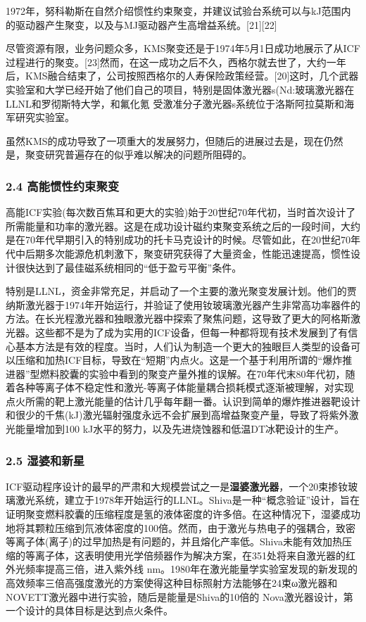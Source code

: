 1972年，努科勒斯在自然介绍惯性约束聚变，并建议试验台系统可以与kJ范围内的驱动器产生聚变，以及与MJ驱动器产生高增益系统。[21][22]

尽管资源有限，业务问题众多，KMS聚变还是于1974年5月1日成功地展示了从ICF过程进行的聚变。[23]然而，在这一成功之后不久，西格尔就去世了，大约一年后，KMS融合结束了，公司按照西格尔的人寿保险政策经营。[20]这时，几个武器实验室和大学已经开始了他们自己的项目，特别是固体激光器s(Nd:玻璃激光器在LLNL和罗彻斯特大学，和氟化氪 受激准分子激光器s系统位于洛斯阿拉莫斯和海军研究实验室。

虽然KMS的成功导致了一项重大的发展努力，但随后的进展过去是，现在仍然是，聚变研究普遍存在的似乎难以解决的问题所阻碍的。
\subsubsection{2.4 高能惯性约束聚变}
高能ICF实验(每次数百焦耳和更大的实验)始于20世纪70年代初，当时首次设计了所需能量和功率的激光器。这是在成功设计磁约束聚变系统之后的一段时间，大约是在70年代早期引入的特别成功的托卡马克设计的时候。尽管如此，在20世纪70年代中后期多次能源危机刺激下，聚变研究获得了大量资金，性能迅速提高，惯性设计很快达到了最佳磁系统相同的“低于盈亏平衡”条件。

特别是LLNL，资金非常充足，并启动了一个主要的激光聚变发展计划。他们的贾纳斯激光器于1974年开始运行，并验证了使用钕玻璃激光器产生非常高功率器件的方法。在长光程激光器和独眼激光器中探索了聚焦问题，这导致了更大的阿格斯激光器。这些都不是为了成为实用的ICF设备，但每一种都将现有技术发展到了有信心基本方法是有效的程度。当时，人们认为制造一个更大的独眼巨人类型的设备可以压缩和加热ICF目标，导致在“短期”内点火。这是一个基于利用所谓的“爆炸推进器”型燃料胶囊的实验中看到的聚变产量外推的误解。在70年代末80年代初，随着各种等离子体不稳定性和激光-等离子体能量耦合损耗模式逐渐被理解，对实现点火所需的靶上激光能量的估计几乎每年翻一番。认识到简单的爆炸推进器靶设计和很少的千焦(kJ)激光辐射强度永远不会扩展到高增益聚变产量，导致了将紫外激光能量增加到100 kJ水平的努力，以及先进烧蚀器和低温DT冰靶设计的生产。
\subsubsection{2.5 湿婆和新星}
ICF驱动程序设计的最早的严肃和大规模尝试之一是\textbf{湿婆激光器}，一个20束掺钕玻璃激光系统，建立于1978年开始运行的LLNL。Shiva是一种“概念验证”设计，旨在证明聚变燃料胶囊的压缩程度是氢的液体密度的许多倍。在这种情况下，湿婆成功地将其颗粒压缩到氘液体密度的100倍。然而，由于激光与热电子的强耦合，致密等离子体(离子)的过早加热是有问题的，并且熔化产率低。Shiva未能有效加热压缩的等离子体，这表明使用光学倍频器作为解决方案，在351处将来自激光器的红外光频率提高三倍，进入紫外线 nm。1980年在激光能量学实验室发现的新发现的高效频率三倍高强度激光的方案使得这种目标照射方法能够在24束ω激光器和 NOVETT激光器中进行实验，随后是能量是Shiva的10倍的 Nova激光器设计，第一个设计的具体目标是达到点火条件。

